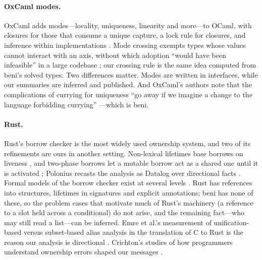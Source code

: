 \paragraph{OxCaml modes.} OxCaml adds modes---locality, uniqueness, linearity and more---to OCaml, with
 closures for those that consume a unique capture, a lock rule for closures, and inference within
implementations \citep{lorenzen2024oxidizing,oxcaml2025uniqueness}. Mode crossing exempts types whose values
cannot interact with an axis, without which adoption ``would have been infeasible'' in a large codebase
\citep[\S1]{peters2026mode}; our crossing rule is the same idea computed from beni's solved types. Two
differences matter. Modes are written in interfaces, while our summaries are inferred and published. And
OxCaml's authors note that the complications of currying for uniqueness ``go away if we imagine a change to
the language forbidding currying'' \citep[\S6.4]{lorenzen2024oxidizing}---which is beni.

\paragraph{Rust.} Rust's borrow checker is the most widely used ownership system, and two of its refinements
are ours in another setting. Non-lexical lifetimes base borrows on liveness \citep{rfc2094}, and two-phase
borrows let a mutable borrow act as a shared one until it is activated \citep{rfc2025}; Polonius recasts
the analysis as Datalog over directional facts \citep{stjerna2020polonius}. Formal models of the borrow
checker exist at several levels \citep{weiss2019oxide,pearce2021lightweight}. Rust has references into
structures, lifetimes in signatures and explicit annotations; beni has none of these, so the problem cases
that motivate much of Rust's machinery (a reference to a slot held across a conditional) do not arise, and
the remaining fact---who may still read a list---can be inferred. Emre et al.'s measurement of
unification-based versus subset-based alias analysis in the translation of C to Rust is the reason our
analysis is directional \citep{emre2023aliasing}. Crichton's studies of how programmers understand ownership
errors shaped our messages \citep{crichton2020usability,crichton2023grounded,crichton2024profiling}.

